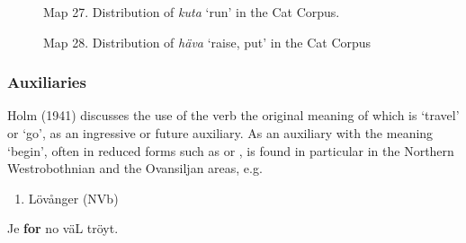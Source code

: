 \clearpage%


\begin{figure}[h]
\centering
\begin{minipage}{4.125in}
\label{bkm:Ref224380018}Map 27. Distribution of \textit{kuta}\textit{ }‘run’ in the Cat Corpus.
\end{minipage}
\end{figure}
\clearpage%



\begin{figure}[h]
\centering
\begin{minipage}{6.71042in}
Map 28. Distribution of \textit{häva} ‘raise, put’ in the Cat Corpus
\end{minipage}
\end{figure}
\clearpage\subsubsection[Auxiliaries]{\rmfamily Auxiliaries}
Holm (1941) discusses the use of the verb the original meaning of which is ‘travel’ or ‘go’, as an ingressive or future auxiliary. As an auxiliary with the meaning ‘begin’, often in reduced forms such as  or , is found in particular in the Northern Westrobothnian and the Ovansiljan areas, e.g. 

\begin{enumerate} %
\item 
Lövånger (NVb)

\end{enumerate} %
\ea\label{}
\gll Je  \textbf{for} no  väL  tröyt.\\


